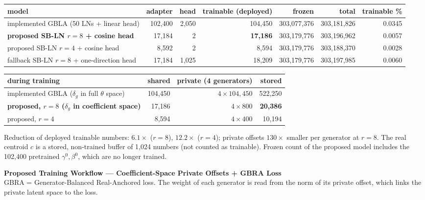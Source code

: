 \documentclass[11pt]{article}
\begin{document}
\vspace{6mm}
\begin{center}
\small
\begin{tabular}{L{70mm}rrrrrr}
\toprule
model & adapter & head & trainable (deployed) & frozen & total & trainable \% \\
\midrule
implemented GBLA (50 LNs + linear head) & 102,400 & 2,050 & 104,450 & 303,077,376 & 303,181,826 & 0.0345 \\
\textbf{proposed SB-LN \(r=8\) + cosine head} & 17,184 & 2 & \textbf{17,186} & 303,179,776 & 303,196,962 & 0.0057 \\
proposed SB-LN \(r=4\) + cosine head & 8,592 & 2 & 8,594 & 303,179,776 & 303,188,370 & 0.0028 \\
fallback SB-LN \(r=8\) + one-direction head & 17,184 & 1,025 & 18,209 & 303,179,776 & 303,197,985 & 0.0060 \\
\bottomrule
\end{tabular}

\vspace{4mm}
\begin{tabular}{L{70mm}rrr}
\toprule
during training & shared & private (4 generators) & stored \\
\midrule
implemented GBLA (\(\delta_g\) in full \(\theta\) space) & 104,450 & \(4\times104{,}450\) & 522,250 \\
\textbf{proposed, \(r=8\) (\(\delta_g\) in coefficient space)} & 17,186 & \(4\times800\) & \textbf{20,386} \\
proposed, \(r=4\) & 8,594 & \(4\times400\) & 10,194 \\
\bottomrule
\end{tabular}
\end{center}

\vfill
{\small Reduction of deployed trainable numbers: \(6.1\times\) (\(r=8\)), \(12.2\times\) (\(r=4\)); private offsets \(130\times\) smaller per generator at \(r=8\). The real centroid \(c\) is a stored, non-trained buffer of 1,024 numbers (not counted as trainable). Frozen count of the proposed model includes the 102,400 pretrained \(\gamma^0,\beta^0\), which are no longer trained.}

\newpage
\begin{center}
{\Large\bfseries Proposed Training Workflow --- Coefficient-Space Private Offsets + GBRA Loss}\\[2pt]
{\small GBRA = Generator-Balanced Real-Anchored loss. The weight of each generator is read from the norm of its private offset, which links the private latent space to the loss.}
\end{center}
\vspace{8mm}
\end{document}
